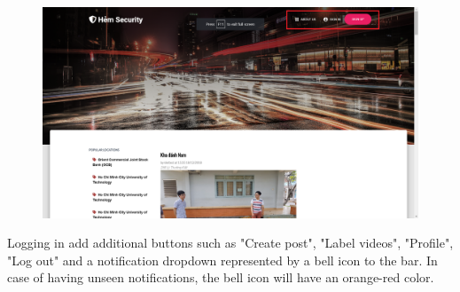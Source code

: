 \begin{figure}[!htb]
\endminipage\hfill
{}
\endminipage\hfill
{}
  \includegraphics[width=\linewidth]{images/chap4/header_not_login.png}
\endminipage
\end{figure}
\cleardoublepage
Logging in add additional buttons such as "Create post", "Label videos",  "Profile", "Log out" and a notification dropdown represented by a bell icon to the bar. In case of having unseen notifications, the bell icon will have an orange-red color.
\\
